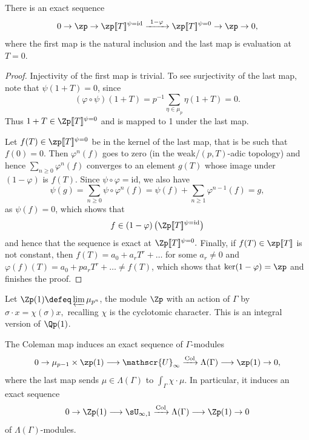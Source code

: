 \documentclass[a4paper,10pt, english, reqno]{smfart}
\newcommand{\lsem}{[\! [}
\newcommand{\rsem}{]\! ]}
\newcommand{\GG}{\Gamma}
\numberwithin{equation}{section}
\begin{document}
\begin{lemma} \label{lem:rest zp*}
	There is an exact sequence
	\[ 0 \to \zp \to \zp\lsem T\rsem ^{\psi=\mathrm{id}} \xrightarrow{\ 1 - \varphi\ } \zp\lsem T\rsem ^{\psi = 0} \to \zp \to 0, \]
	where the first map is the natural inclusion and the last map is evaluation at $T = 0$.
\end{lemma}

\begin{proof}
	Injectivity of the first map is trivial. To see surjectivity of the last map, note that $\psi(1 + T) = 0$, since 
	\[(\varphi \circ \psi)(1 + T) = p^{-1} \sum_{\eta \in \mu_p} \eta (1 + T) = 0.\]
	Thus $1+T \in \Zp\lsem T\rsem^{\psi=0}$ and is mapped to 1 under the last map.
 
 Let $f(T) \in \zp\lsem T\rsem ^{\psi = 0}$ be in the kernel of the last map, that is be such that $f(0) = 0$. Then $\varphi^n(f)$ goes to zero (in the weak/$(p,T)$-adic topology) and hence $\sum_{n \geq 0} \varphi^n(f)$ converges to an element $g(T)$ whose image under $(1 - \varphi)$ is $f(T)$. Since $\psi\circ \varphi = \mathrm{id}$, we also have
	\[ \psi(g) = \sum_{n\geq 0}\psi \circ \varphi^n(f) = \psi(f) + \sum_{n\geq 1} \varphi^{n-1}(f) = g, \]
	as $\psi(f) = 0$, which shows that 
	\[f \in (1-\varphi)\left(\Zp\lsem T\rsem ^{\psi=\mathrm{id}}\right)\]
	and hence that the sequence is exact at $\Zp\lsem T\rsem ^{\psi=0}.$ Finally, if $f(T) \in \zp\lsem T\rsem $ is not constant, then $f(T) = a_0 + a_r T^{r} + \hdots $ for some $a_r \neq 0$ and $\varphi(f)(T) = a_0 + p a_r T^r + \hdots \neq f(T)$, which shows that $\ker(1 - \varphi) = \zp$ and finishes the proof.
\end{proof}



\begin{definition}\label{def:Zp(1)}
	Let $\Zp(1) \defeq \varprojlim \mu_{p^n}$, the module $\Zp$ with an action of $\GG$ by $\sigma \cdot x = \chi(\sigma)x,$ recalling $\chi$ is the cyclotomic character. This is an integral version of $\Qp(1)$.
\end{definition}

\begin{theorem} \label{thm:fund exact seq}
	The Coleman map induces an exact sequence of $\GG$-modules
	\[ 0 \to \mu_{p - 1} \times \zp(1) \longrightarrow \mathscr{U}_\infty \xrightarrow{\mathrm{Col}} \Lambda(\GG) \longrightarrow \zp(1) \to 0, \] where the last map sends $\mu \in \Lambda(\GG)$ to $\int_{\GG} \chi \cdot \mu$. In particular, it induces an exact sequence
	\[
	0 \to \Zp(1) \longrightarrow \sU_{\infty,1} \xrightarrow{\mathrm{Col}} \Lambda(\GG) \longrightarrow \Zp(1) \to 0
	\]
	of $\Lambda(\GG)$-modules.
\end{theorem}
\end{document}
